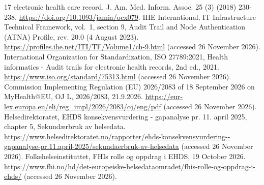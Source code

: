 \documentclass[5p,twocolumn]{elsarticle}
\begin{document}
\begin{thebibliography}{17}
electronic health care record, J. Am. Med. Inform. Assoc. 25 (3) (2018)
230-238. \url{https://doi.org/10.1093/jamia/ocx079}.
 IHE International, IT Infrastructure Technical Framework,
vol.~1, section 9, Audit Trail and Node Authentication (ATNA) Profile,
rev. 20.0 (4 August 2023).
\url{https://profiles.ihe.net/ITI/TF/Volume1/ch-9.html} (accessed 26
November 2026).
 International Organization for Standardization, ISO 27789:2021,
Health informatics - Audit trails for electronic health records, 2nd
ed., 2021. \url{https://www.iso.org/standard/75313.html} (accessed 26
November 2026).
 Commission Implementing Regulation (EU) 2026/2083 of 18
September 2026 on MyHealth@EU, OJ L, 2026/2083, 21.9.2026.
\url{https://eur-lex.europa.eu/eli/reg_impl/2026/2083/oj/eng/pdf}
(accessed 26 November 2026).
 Helsedirektoratet, EHDS konsekvensvurdering - gapanalyse pr.
11. april 2025, chapter 5, Sekundærbruk av helsedata.
\url{https://www.helsedirektoratet.no/rapporter/ehds-konsekvensvurdering--gapanalyse-pr.11.april-2025/sekundaerbruk-av-helsedata}
(accessed 26 November 2026).
 Folkehelseinstituttet, FHIs rolle og oppdrag i EHDS, 19 October
2026.
\url{https://www.fhi.no/hd/det-europeiske-helsedataomradet/fhis-rolle-og-oppdrag-i-ehds/}
(accessed 26 November 2026).
\end{thebibliography}
\end{document}
